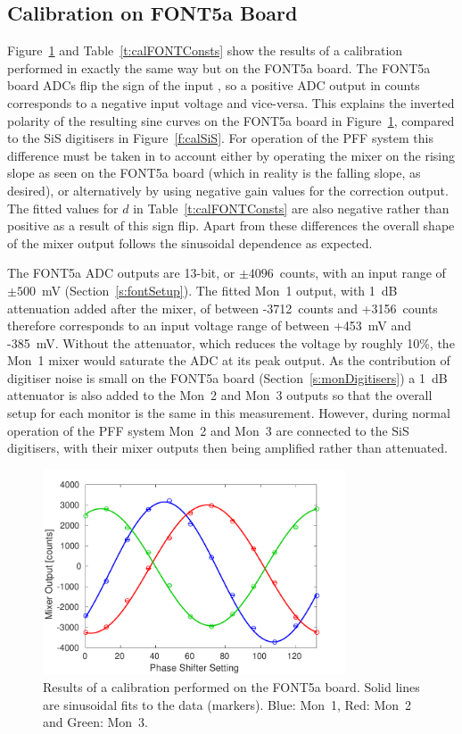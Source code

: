 \subsection{Calibration on FONT5a Board}
\label{ss:FONTCal}

Figure~\ref{f:calFONT} and Table~\ref{t:calFONTConsts} show the results of a calibration performed in exactly the same way but on the FONT5a board. The FONT5a board ADCs flip the sign of the input \cite{glennPriv}, so a positive ADC output in counts corresponds to a negative input voltage and vice-versa. This explains the inverted polarity of the resulting sine curves on the FONT5a board in Figure~\ref{f:calFONT}, compared to the SiS digitisers in Figure~\ref{f:calSiS}. For operation of the PFF system this difference must be taken in to account either by operating the mixer on the rising slope as seen on the FONT5a board (which in reality is the falling slope, as desired), or alternatively by using negative gain values for the correction output. The fitted values for \(d\) in Table~\ref{t:calFONTConsts} are also negative rather than positive as a result of this sign flip. Apart from these differences the overall shape of the mixer output follows the sinusoidal dependence as expected.

The FONT5a ADC outputs are 13-bit, or \(\pm4096\)~counts, with an input range of \(\pm500\)~mV (Section~\ref{s:fontSetup}). The fitted Mon~1 output, with 1~dB attenuation added after the mixer, of between -3712~counts and +3156~counts therefore corresponds to an input voltage range of between +453~mV and -385~mV. Without the attenuator, which reduces the voltage by roughly 10\%, the Mon~1 mixer would saturate the ADC at its peak output. As the contribution of digitiser noise is small on the FONT5a board (Section~\ref{s:monDigitisers}) a 1~dB attenuator is also added to the Mon~2 and Mon~3 outputs so that the overall setup for each monitor is the same in this measurement. However, during normal operation of the PFF system Mon~2 and Mon~3 are connected to the SiS digitisers, with their mixer outputs then being amplified rather than attenuated.

\begin{figure}
  \centering
  \includegraphics[width=0.8\textwidth]{Figures/phaseMons/calFONT}
  \caption{Results of a calibration performed on the FONT5a board. Solid lines are sinusoidal fits to the data (markers). Blue: Mon~1, Red: Mon~2 and Green: Mon~3.}
  \label{f:calFONT}
\end{figure}


